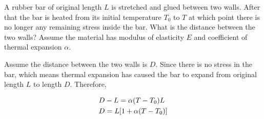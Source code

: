 \documentclass[
10pt,
a4paper,
openany,
svgnames,
]{book}
\begin{document}
\begin{example}
  
  A rubber bar of original length $L$ is stretched and glued between two walls. After that the bar is heated from its initial temperature $T_0$ to $T$ at which point there is no longer any remaining stress inside the bar. What is the distance between the two walls? Assume the material has modulus of elasticity $E$ and coefficient of thermal expansion $\alpha$.
  
  \begin{figure}[H]
    \centering
  \end{figure}
  
\end{example}
\begin{solution}
  Assume the distance between the two walls is $D$. Since there is no stress in the bar, which means thermal expansion has caused the bar to expand from original length $L$ to length $D$. Therefore,
  
\[\begin{gathered}
  D - L = \alpha (T - T_0)L \hfill \\
  D = L[1 + \alpha (T - T_0)] \hfill \\ 
\end{gathered}\]
	
\end{solution}
\end{document}
